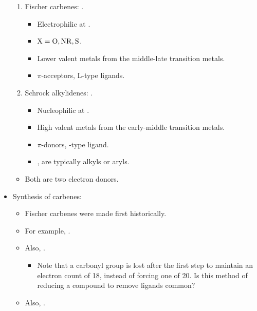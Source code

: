 \documentclass[../notes.tex]{subfiles}
\begin{document}
\begin{itemize}
\begin{figure}[H]
    \end{figure}
    \begin{enumerate}
        \item Fischer carbenes: .
        \begin{itemize}
            \item Electrophilic at .
            \item $\ce{X}=\ce{O},\ce{NR},\ce{S}$.
            \item Lower valent metals from the middle-late transition metals.
            \item $\pi$-acceptors, L-type ligands.
        \end{itemize}
        \item Schrock alkylidenes: .
        \begin{itemize}
            \item Nucleophilic at .
            \item High valent metals from the early-middle transition metals.
            \item $\pi$-donors, -type ligand.
            \item {}, are typically alkyls or aryls.
        \end{itemize}
    \end{enumerate}
    \begin{itemize}
        \item Both are two electron donors.
    \end{itemize}
    \item Synthesis of carbenes:
    \begin{itemize}
        \item Fischer carbenes were made first historically.
        \item For example, .
        \item Also, .
        \begin{itemize}
            \item Note that a carbonyl group is lost after the first step to maintain an electron count of 18, instead of forcing one of 20. Is this method of reducing a compound to remove ligands common?
        \end{itemize}
        \item Also, .

\end{itemize}
\end{itemize}
\end{document}

